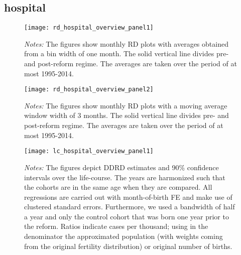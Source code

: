 \subsection{hospital}
\begin{landscape}
\begin{figure}[H]
	\centering
	\begin{minipage}{.95\linewidth}
	\texttt{[image: rd\_hospital\_overview\_panel1]}
	{\scriptsize \emph{Notes:} The figures show monthly RD plots with averages obtained from a bin width of one month. The solid vertical line divides pre- and post-reform regime. The averages are taken over the period of at most 1995-2014. \par}
\end{minipage}
\end{figure}
\end{landscape}
\begin{landscape}
\begin{figure}[H]
	\centering
\begin{minipage}{.95\linewidth}
	\texttt{[image: rd\_hospital\_overview\_panel2]}
	{\scriptsize \emph{Notes:} The figures show monthly RD plots with a moving average window width of 3 months. The solid vertical line divides pre- and post-reform regime. The averages are taken over the period of at most 1995-2014. \par}
\end{minipage}
\end{figure}
\end{landscape}


\begin{landscape}
\begin{figure}[H]
\centering
\begin{minipage}{.9\linewidth}
\texttt{[image: lc\_hospital\_overview\_panel1]}
{\scriptsize \emph{Notes:} The figures depict DDRD estimates and 90\% confidence intervals over the life-course. The years are harmonized such that the cohorts are in the same age when they are compared. All regressions are carried out with month-of-birth FE and make use of clustered standard errors. Furthermore, we used a bandwidth of half a year and only the control cohort that was born one year prior to the reform. Ratios indicate cases per thousand; using in the denominator the approximated population (with weights coming from the original fertility distribution) or original number of births. \par}
\end{minipage}
\end{figure}
\end{landscape}
